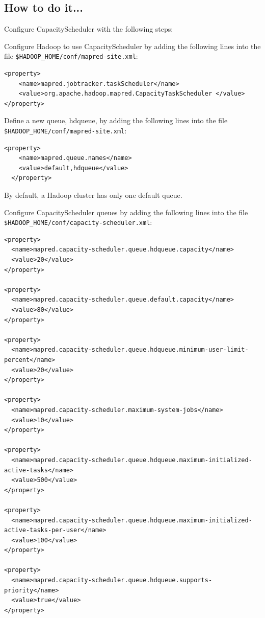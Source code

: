 \subsection*{How to do it...}
Configure CapacityScheduler with the following steps: 

Configure Hadoop to use CapacityScheduler by adding the following lines into the file \verb|$HADOOP_HOME/conf/mapred-site.xml|:
\lstset{style=bashstyle}
\begin{lstlisting}
<property>
    <name>mapred.jobtracker.taskScheduler</name>
    <value>org.apache.hadoop.mapred.CapacityTaskScheduler </value>
</property>
\end{lstlisting}

Define a new queue, hdqueue, by adding the following lines into the file \verb|$HADOOP_HOME/conf/mapred-site.xml|:
\lstset{style=bashstyle}
\begin{lstlisting}
<property>
    <name>mapred.queue.names</name>
    <value>default,hdqueue</value>
  </property>
\end{lstlisting}

\begin{info}
By default, a Hadoop cluster has only one default queue.
\end{info}
Configure CapacityScheduler queues by adding the following lines into the file \verb|$HADOOP_HOME/conf/capacity-scheduler.xml|:
\lstset{style=bashstyle}
\begin{lstlisting}
<property>
  <name>mapred.capacity-scheduler.queue.hdqueue.capacity</name>
  <value>20</value>
</property>

<property>
  <name>mapred.capacity-scheduler.queue.default.capacity</name>
  <value>80</value>
</property>

<property>
  <name>mapred.capacity-scheduler.queue.hdqueue.minimum-user-limit-percent</name>
  <value>20</value>
</property>

<property>
  <name>mapred.capacity-scheduler.maximum-system-jobs</name>
  <value>10</value>
</property>

<property>
  <name>mapred.capacity-scheduler.queue.hdqueue.maximum-initialized-active-tasks</name>
  <value>500</value>
</property>

<property>
  <name>mapred.capacity-scheduler.queue.hdqueue.maximum-initialized-active-tasks-per-user</name>
  <value>100</value>
</property>

<property>
  <name>mapred.capacity-scheduler.queue.hdqueue.supports-priority</name>
  <value>true</value>
</property>
\end{lstlisting}

